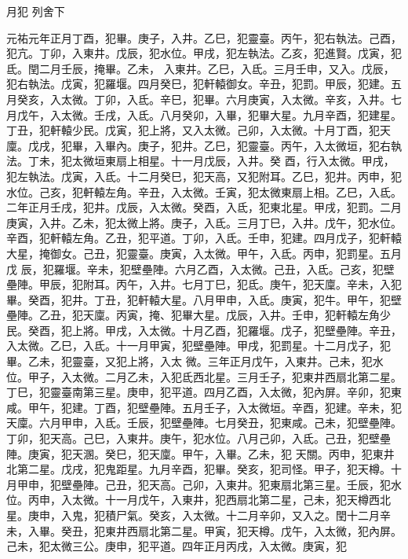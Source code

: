 
\begin{pinyinscope}

 月犯
 列舍下



 元祐元年正月丁酉，犯畢。庚子，入井。乙巳，犯靈臺。丙午，犯右執法。己酉，犯亢。丁卯，入東井。戊辰，犯水位。甲戌，犯左執法。乙亥，犯進賢。戊寅，犯氐。閏二月壬辰，掩畢。乙未，
 入東井。乙巳，入氐。三月壬申，又入。戊辰，犯右執法。戊寅，犯羅堰。四月癸巳，犯軒轅御女。辛丑，犯罰。甲辰，犯建。五月癸亥，入太微。丁卯，入氐。辛巳，犯畢。六月庚寅，入太微。辛亥，入井。七月戊午，入太微。壬戌，入氐。八月癸卯，入畢，犯畢大星。九月辛酉，犯建星。丁丑，犯軒轅少民。戊寅，犯上將，又入太微。己卯，入太微。十月丁酉，犯天廩。戊戌，犯畢，入畢內。庚子，犯井。乙巳，犯靈臺。丙午，入太微垣，犯右執法。丁未，犯太微垣東扇上相星。十一月戊辰，入井。癸
 酉，行入太微。甲戌，犯左執法。戊寅，入氐。十二月癸巳，犯天高，又犯附耳。乙巳，犯井。丙申，犯水位。己亥，犯軒轅左角。辛丑，入太微。壬寅，犯太微東扇上相。乙巳，入氐。二年正月壬戌，犯井。戊辰，入太微。癸酉，入氐，犯東北星。甲戌，犯罰。二月庚寅，入井。乙未，犯太微上將。庚子，入氐。三月丁巳，入井。戊午，犯水位。辛酉，犯軒轅左角。乙丑，犯平道。丁卯，入氐。壬申，犯建。四月戊子，犯軒轅大星，掩御女。己丑，犯靈臺。庚寅，入太微。甲午，入氐。丙申，犯罰星。五月戊
 辰，犯羅堰。辛未，犯壁壘陣。六月乙酉，入太微。己丑，入氐。己亥，犯壁壘陣。甲辰，犯附耳。丙午，入井。七月丁巳，犯氐。庚午，犯天廩。辛未，入犯畢。癸酉，犯井。丁丑，犯軒轅大星。八月甲申，入氐。庚寅，犯牛。甲午，犯壁壘陣。乙丑，犯天廩。丙寅，掩、犯畢大星。戊辰，入井。壬申，犯軒轅左角少民。癸酉，犯上將。甲戌，入太微。十月乙酉，犯羅堰。戊子，犯壁壘陣。辛丑，入太微。乙巳，入氐。十一月甲寅，犯壁壘陣。甲戌，犯罰星。十二月戊子，犯畢。乙未，犯靈臺，又犯上將，入太
 微。三年正月戊午，入東井。己未，犯水位。甲子，入太微。二月乙未，入犯氐西北星。三月壬子，犯東井西扇北第二星。丁巳，犯靈臺南第三星。庚申，犯平道。四月乙酉，入太微，犯內屏。辛卯，犯東咸。甲午，犯建。丁酉，犯壁壘陣。五月壬子，入太微垣。辛酉，犯建。辛未，犯天廩。六月甲申，入氐。壬辰，犯壁壘陣。七月癸丑，犯東咸。己未，犯壁壘陣。丁卯，犯天高。己巳，入東井。庚午，犯水位。八月己卯，入氐。己丑，犯壁壘陣。庚寅，犯天溷。癸巳，犯天廩。甲午，入畢。乙未，犯
 天關。丙申，犯東井北第二星。戊戌，犯鬼距星。九月辛酉，犯畢。癸亥，犯司怪。甲子，犯天樽。十月甲申，犯壁壘陣。己丑，犯天高。己卯，入東井。犯東扇北第三星。壬辰，犯水位。丙申，入太微。十一月戊午，入東井，犯西扇北第二星，己未，犯天樽西北星。庚申，入鬼，犯積尸氣。癸亥，入太微。十二月辛卯，又入之。閏十二月辛未，入畢。癸丑，犯東井西扇北第二星。甲寅，犯天樽。戊午，入太微，犯內屏。己未，犯太微三公。庚申，犯平道。四年正月丙戌，入太微。庚寅，犯

\end{pinyinscope}
